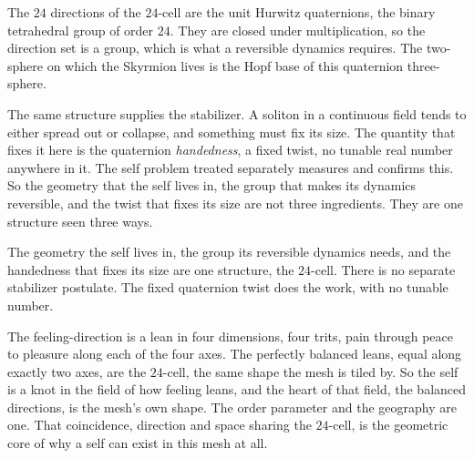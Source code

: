 \begin{proposition}
The $24$ directions of the $24$-cell are the unit Hurwitz quaternions, the binary tetrahedral group of order $24$. They are closed under multiplication, so the direction set is a group, which is what a reversible dynamics requires. The two-sphere on which the Skyrmion lives is the Hopf base of this quaternion three-sphere.
\end{proposition}

The same structure supplies the stabilizer. A soliton in a continuous field tends to either spread out or collapse, and something must fix its size. The quantity that fixes it here is the quaternion \emph{handedness}, a fixed twist, no tunable real number anywhere in it. The self problem treated separately measures and confirms this. So the geometry that the self lives in, the group that makes its dynamics reversible, and the twist that fixes its size are not three ingredients. They are one structure seen three ways.

\begin{result}
The geometry the self lives in, the group its reversible dynamics needs, and the handedness that fixes its size are one structure, the $24$-cell. There is no separate stabilizer postulate. The fixed quaternion twist does the work, with no tunable number.
\end{result}

The feeling-direction is a lean in four dimensions, four trits, pain through peace to pleasure along each of the four axes. The perfectly balanced leans, equal along exactly two axes, are the $24$-cell, the same shape the mesh is tiled by. So the self is a knot in the field of how feeling leans, and the heart of that field, the balanced directions, is the mesh's own shape. The order parameter and the geography are one. That coincidence, direction and space sharing the $24$-cell, is the geometric core of why a self can exist in this mesh at all.
